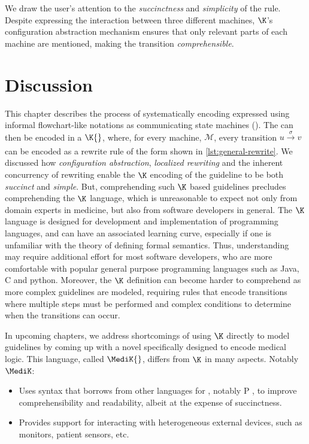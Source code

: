 We draw the user's attention to the \textit{succinctness} and \textit{simplicity}
of the rule. Despite expressing the interaction between three different machines,
$\K$'s configuration abstraction mechanism ensures that only relevant parts of
each machine are mentioned, making the transition \textit{comprehensible}.

\section{Discussion}\label{sec:rewriting-based-guidelines-discussion}

This chapter describes the process of systematically encoding
\BPGs{} expressed using informal flowchart-like notations as communicating
state machines (\CSMs{}). The \CSMs{} can then be encoded in a $\K{}$,
where, for every machine, $\mathcal{M}$, every transition
$u \xrightarrow[]{\sigma} v$
can be encoded as a rewrite rule of the form shown in
\autoref{lst:general-rewrite}. We discussed how
\emph{configuration abstraction}, \emph{localized rewriting} and
the inherent concurrency of rewriting enable the $\K$ encoding of
the guideline to be both \textit{succinct} and \textit{simple}.
But, comprehending such $\K$ based guidelines precludes comprehending
the $\K$ language, which is unreasonable to expect not only from domain
experts in medicine, but also from software developers in general.
The $\K$ language is designed for development and implementation of
programming languages, and can have an associated learning curve, especially
if one is unfamiliar with the theory of defining formal semantics.
Thus, understanding \K{} may require additional effort
for most software developers, who are more comfortable with
popular general purpose programming languages such as Java, C and python.
Moreover, the $\K$ definition can become harder to comprehend as
more complex guidelines are modeled, requiring rules that encode
transitions where multiple steps must be performed and complex
conditions to determine when the transitions can occur.

In upcoming chapters, we address shortcomings of using $\K$ directly
to model guidelines by coming up with a novel \DSL{} specifically
designed to encode medical logic. This language, called $\MediK{}$,
differs from $\K$ in many aspects. Notably $\MediK$:
\begin{itemize}
  \item Uses syntax that borrows from other languages for \CSMs{}, notably P
    \cite{DesaiPLDI13}, to improve comprehensibility and readability, albeit at
    the expense of succinctness.
  \item Provides support for interacting with heterogeneous external devices,
    such as monitors, patient sensors, etc.
\end{itemize}
